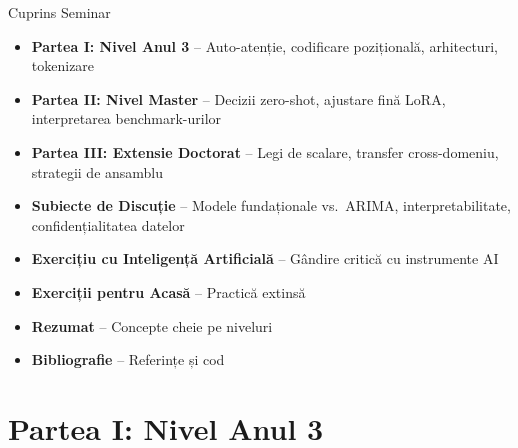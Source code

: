 \documentclass[9pt, aspectratio=169, t]{beamer}
\subtitle{Seminar 11: LLM-uri și Modele Fundaționale pentru Serii de Timp}
\begin{document}
{
\begin{frame}
    \titlepage
\end{frame}
}

\begin{frame}{Cuprins Seminar}
    \begin{cminipage}{0.95\textwidth}
    \begin{itemize}
        \item \textbf{Partea I: Nivel Anul 3} -- Auto-atenție, codificare pozițională, arhitecturi, tokenizare
        \vspace{0.15cm}
        \item \textbf{Partea II: Nivel Master} -- Decizii zero-shot, ajustare fină LoRA, interpretarea benchmark-urilor
        \vspace{0.15cm}
        \item \textbf{Partea III: Extensie Doctorat} -- Legi de scalare, transfer cross-domeniu, strategii de ansamblu
        \vspace{0.15cm}
        \item \textbf{Subiecte de Discuție} -- Modele fundaționale vs.\ ARIMA, interpretabilitate, confidențialitatea datelor
        \vspace{0.15cm}
        \item \textbf{Exercițiu cu Inteligență Artificială} -- Gândire critică cu instrumente AI
        \vspace{0.15cm}
        \item \textbf{Exerciții pentru Acasă} -- Practică extinsă
        \vspace{0.15cm}
        \item \textbf{Rezumat} -- Concepte cheie pe niveluri
        \vspace{0.15cm}
        \item \textbf{Bibliografie} -- Referințe și cod
    \end{itemize}
    \end{cminipage}
\end{frame}

\section{Partea I: Nivel Anul 3}
\end{document}
